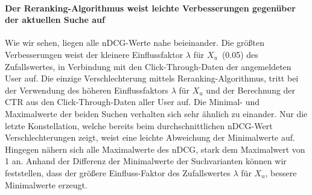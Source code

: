 \paragraph{Der Reranking-Algorithmus weist leichte Verbesserungen gegenüber der aktuellen Suche auf}
Wie wir sehen, liegen alle nDCG-Werte nahe beieinander. Die größten Verbesserungen weist der kleinere Einflussfaktor $\lambda$ für $X_u$~(0.05) des Zufallswertes, in Verbindung mit den Click-Through-Daten der angemeldeten User auf. Die einzige Verschlechterung mittels Reranking-Algorithmus, tritt bei der Verwendung des höheren Einflussfaktors $\lambda$ für $X_u$ und der Berechnung der CTR aus den Click-Through-Daten aller User auf. Die Minimal- und Maximalwerte der beiden Suchen verhalten sich sehr ähnlich zu einander. Nur die letzte Konstellation, welche bereits beim durchschnittlichen nDCG-Wert Verschlechterungen zeigt, weist eine leichte Abweichung der Minimalwerte auf. Hingegen nähern sich alle Maximalwerte des nDCG, stark dem Maximalwert von 1 an. Anhand der Differenz der Minimalwerte der Suchvarianten können wir feststellen, dass der größere Einfluss-Faktor des Zufallswertes $\lambda$ für $X_u$, bessere Minimalwerte erzeugt.